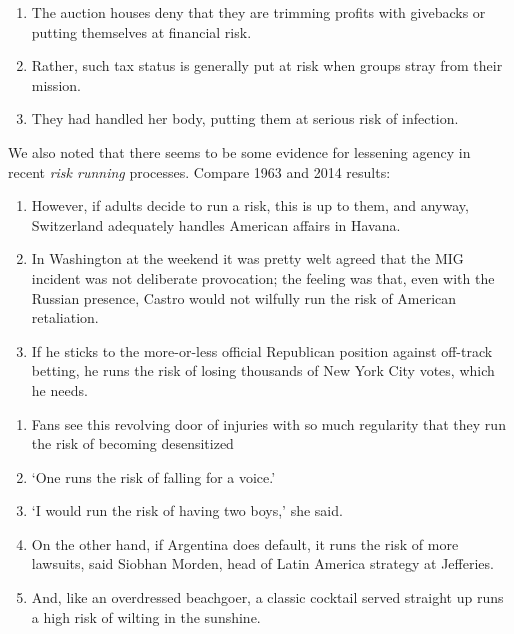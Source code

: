             \begin{enumerate}  [before=\itshape,font=\normalfont] \setlength\itemsep{0em} \small
                \item The auction houses deny that they are trimming profits with givebacks or putting themselves at financial risk.
                \item Rather, such tax status is generally put at risk when groups stray from their mission.
                \item They had handled her body, putting them at serious risk of infection.
            \end{enumerate}

            We also noted that there seems to be some evidence for lessening agency in recent \emph{risk running} processes. Compare 1963 and 2014 results:

            \begin{enumerate} [before=\itshape,font=\normalfont]  \setlength\itemsep{0em} \small
            \item However, if adults decide to run a risk, this is up to them, and anyway, Switzerland adequately handles American affairs in Havana.
            \item In Washington at the weekend it was pretty welt agreed that the MIG incident was not deliberate provocation; the feeling was that, even with the Russian presence, Castro would not wilfully run the risk of American retaliation.
            \item  If he sticks to the more-or-less official Republican position against off-track betting, he runs the risk of losing thousands of New York City votes, which he needs.
            \end{enumerate}

            \begin{enumerate} [before=\itshape,font=\normalfont]   \setlength\itemsep{0em} \small
                \item Fans see this revolving door of injuries with so much regularity that they run the risk of becoming desensitized 
                \item `One runs the risk of falling for a voice.'
                \item `I would run the risk of having two boys,' she said.
                \item On the other hand, if Argentina does default, it runs the risk of more lawsuits, said Siobhan Morden, head of Latin America strategy at Jefferies.
                \item And, like an overdressed beachgoer, a classic cocktail served straight up runs a high risk of wilting in the sunshine.
            \end{enumerate}

